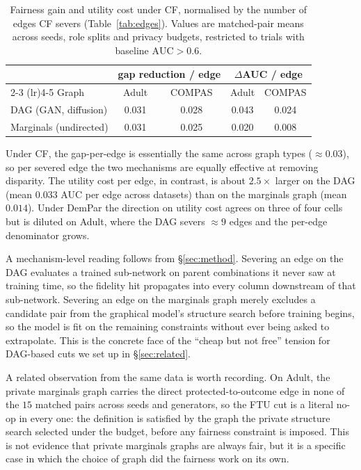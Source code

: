 \documentclass{article}
\begin{document}
\begin{table}[h]
  \caption{Fairness gain and utility cost under CF, normalised by the
  number of edges CF severs (Table~\ref{tab:edges}). Values are matched-pair
  means across seeds, role splits and privacy budgets, restricted to trials
  with baseline $\mathrm{AUC}>0.6$.}
  \label{tab:per_edge}
  \centering
  \footnotesize
  \begin{tabular}{l cc cc}
    \toprule
    & \multicolumn{2}{c}{gap reduction / edge} & \multicolumn{2}{c}{$\Delta$AUC / edge} \\
    \cmidrule(lr){2-3} \cmidrule(lr){4-5}
    Graph & Adult & COMPAS & Adult & COMPAS \\
    \midrule
    DAG (GAN, diffusion)   & 0.031 & 0.028 & 0.043 & 0.024 \\
    Marginals (undirected) & 0.031 & 0.025 & 0.020 & 0.008 \\
    \bottomrule
  \end{tabular}
\end{table}

Under CF, the gap-per-edge is essentially the same across graph types
($\approx 0.03$), so per severed edge the two mechanisms are equally
effective at removing disparity. The utility cost per edge, in contrast, is
about $2.5\times$ larger on the DAG (mean $0.033$ AUC per edge across
datasets) than on the marginals graph (mean $0.014$). Under DemPar the
direction on utility cost agrees on three of four cells but is diluted on
Adult, where the DAG severs $\approx 9$ edges and the per-edge denominator
grows.

A mechanism-level reading follows from \S\ref{sec:method}. Severing an edge
on the DAG evaluates a trained sub-network on parent combinations it never
saw at training time, so the fidelity hit propagates into every column
downstream of that sub-network. Severing an edge on the marginals graph
merely excludes a candidate pair from the graphical model's structure search
before training begins, so the model is fit on the remaining constraints
without ever being asked to extrapolate. This is the concrete face of the
``cheap but not free'' tension for DAG-based cuts we set up in
\S\ref{sec:related}.

A related observation from the same data is worth recording. On Adult, the
private marginals graph carries the direct protected-to-outcome edge in none
of the $15$ matched pairs across seeds and generators, so the FTU cut is a
literal no-op in every one: the definition is satisfied by the graph the
private structure search selected under the budget, before any fairness
constraint is imposed. This is not evidence that private marginals graphs
are always fair, but it is a specific case in which the choice of graph did
the fairness work on its own.


\end{document}
